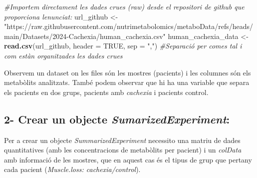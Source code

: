 \documentclass[
]{article}
\newenvironment{Shaded}{\begin{snugshade}}{\end{snugshade}}
\newcommand{\AttributeTok}[1]{\textcolor[rgb]{0.13,0.29,0.53}{#1}}
\newcommand{\CommentTok}[1]{\textcolor[rgb]{0.56,0.35,0.01}{\textit{#1}}}
\newcommand{\ConstantTok}[1]{\textcolor[rgb]{0.56,0.35,0.01}{#1}}
\newcommand{\DecValTok}[1]{\textcolor[rgb]{0.00,0.00,0.81}{#1}}
\newcommand{\FunctionTok}[1]{\textcolor[rgb]{0.13,0.29,0.53}{\textbf{#1}}}
\newcommand{\NormalTok}[1]{#1}
\newcommand{\OtherTok}[1]{\textcolor[rgb]{0.56,0.35,0.01}{#1}}
\newcommand{\SpecialCharTok}[1]{\textcolor[rgb]{0.81,0.36,0.00}{\textbf{#1}}}
\newcommand{\StringTok}[1]{\textcolor[rgb]{0.31,0.60,0.02}{#1}}
\begin{document}
\begin{Shaded}
\begin{Highlighting}[]
\CommentTok{\#Importem directament les dades crues (raw) desde el repositori de github que proporciona l\textquotesingle{}enunciat:}
\NormalTok{url\_github }\OtherTok{\textless{}{-}} \StringTok{"https://raw.githubusercontent.com/nutrimetabolomics/metaboData/refs/heads/main/Datasets/2024{-}Cachexia/human\_cachexia.csv"} 
\NormalTok{human\_cachexia\_data }\OtherTok{\textless{}{-}} \FunctionTok{read.csv}\NormalTok{(url\_github, }\AttributeTok{header =} \ConstantTok{TRUE}\NormalTok{, }\AttributeTok{sep =} \StringTok{","}\NormalTok{) }\CommentTok{\#Separació per comes tal i com estàn organitzades les dades crues}
\end{Highlighting}
\end{Shaded}

Observem un dataset on les files són les mostres (pacients) i les
columnes són els metabòlits analitzats. També podem observar que hi ha
una variable que separa els pacients en dos grups, pacients amb
\emph{cachexia} i pacients control.

\subsection{\texorpdfstring{2- Crear un objecte
\emph{SumarizedExperiment}:}{2- Crear un objecte SumarizedExperiment:}}\label{crear-un-objecte-sumarizedexperiment}

Per a crear un objecte \emph{SummarizedExperiment} necessito una matriu
de dades quantitatives (amb les concentracions de metabòlits per
pacient) i un \emph{colData} amb informació de les mostres, que en
aquest cas és el tipus de grup que pertany cada pacient
(\emph{Muscle.loss: cachexia/control}).

\begin{Shaded}
\end{Shaded}
\end{document}
